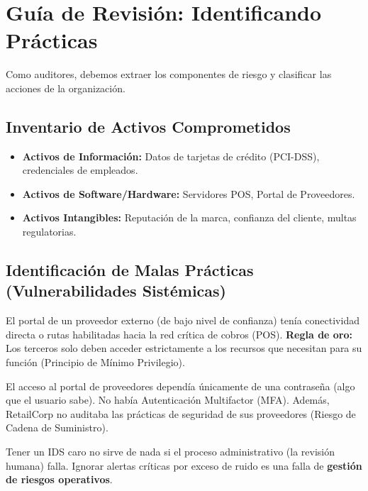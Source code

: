 \documentclass[11pt,a4paper]{article}
\begin{document}
\section{Guía de Revisión: Identificando Prácticas}
Como auditores, debemos extraer los componentes de riesgo y clasificar las acciones de la organización.

\subsection{Inventario de Activos Comprometidos}
\begin{itemize}[leftmargin=*]
  \item \textbf{Activos de Información:} Datos de tarjetas de crédito (PCI-DSS), credenciales de empleados.
  \item \textbf{Activos de Software/Hardware:} Servidores POS, Portal de Proveedores.
  \item \textbf{Activos Intangibles:} Reputación de la marca, confianza del cliente, multas regulatorias.
\end{itemize}

\subsection{Identificación de Malas Prácticas (Vulnerabilidades Sistémicas)}

\begin{alerta}
El portal de un proveedor externo (de bajo nivel de confianza) tenía conectividad directa o rutas habilitadas hacia la red crítica de cobros (POS). \textbf{Regla de oro:} Los terceros solo deben acceder estrictamente a los recursos que necesitan para su función (Principio de Mínimo Privilegio).
\end{alerta}

\begin{alerta}
El acceso al portal de proveedores dependía únicamente de una contraseña (algo que el usuario sabe). No había Autenticación Multifactor (MFA). Además, RetailCorp no auditaba las prácticas de seguridad de sus proveedores (Riesgo de Cadena de Suministro).
\end{alerta}

\begin{alerta}
Tener un IDS caro no sirve de nada si el proceso administrativo (la revisión humana) falla. Ignorar alertas críticas por exceso de ruido es una falla de \textbf{gestión de riesgos operativos}.
\end{alerta}
\end{document}
